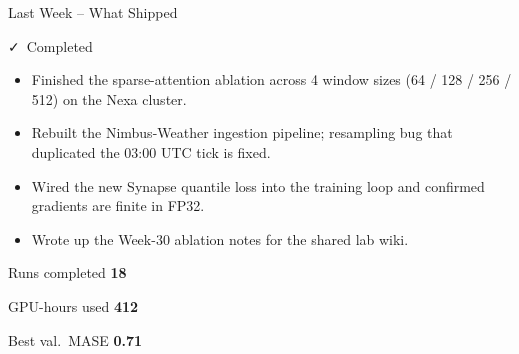 \begin{frame}{Last Week -- What Shipped}

\begin{doneBox}{\faCheck\ Completed}
\begin{itemize}[leftmargin=1.3em,itemsep=4pt]
  \item Finished the sparse-attention ablation across 4 window sizes (64 / 128 / 256 / 512) on the Nexa cluster.
  \item Rebuilt the Nimbus-Weather ingestion pipeline; resampling bug that duplicated the 03:00 UTC tick is fixed.
  \item Wired the new Synapse quantile loss into the training loop and confirmed gradients are finite in FP32.
  \item Wrote up the Week-30 ablation notes for the shared lab wiki.
\end{itemize}
\end{doneBox}

\vspace{0.35cm}
\begin{center}
\begin{minipage}{0.30\linewidth}
  \begin{statBox}{Runs completed}
    \Large\bfseries\color{tealAccent} 18
  \end{statBox}
\end{minipage}\hfill
\begin{minipage}{0.30\linewidth}
  \begin{statBox}{GPU-hours used}
    \Large\bfseries\color{tealAccent} 412
  \end{statBox}
\end{minipage}\hfill
\begin{minipage}{0.30\linewidth}
  \begin{statBox}{Best val.\ MASE}
    \Large\bfseries\color{tealAccent} 0.71
  \end{statBox}
\end{minipage}
\end{center}

\end{frame}

